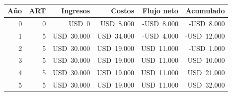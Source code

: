 \begin{table}[htbp]
\centering
\caption[Flujo de fondos del escenario base (USD)]{ \fuentepropia}
\label{tab:negocio-flujo-base}
\small
\begin{tabular}{rrrrrr}
\hline
\textbf{A\~no} & \textbf{ART} & \textbf{Ingresos} & \textbf{Costos} & \textbf{Flujo neto} & \textbf{Acumulado} \\
\hline
0 & 0 & USD~0 & USD~8.000 & -USD~8.000 & -USD~8.000 \\
1 & 5 & USD~30.000 & USD~34.000 & -USD~4.000 & -USD~12.000 \\
2 & 5 & USD~30.000 & USD~19.000 & USD~11.000 & -USD~1.000 \\
3 & 5 & USD~30.000 & USD~19.000 & USD~11.000 & USD~10.000 \\
4 & 5 & USD~30.000 & USD~19.000 & USD~11.000 & USD~21.000 \\
5 & 5 & USD~30.000 & USD~19.000 & USD~11.000 & USD~32.000 \\
\hline
\end{tabular}
\end{table}
